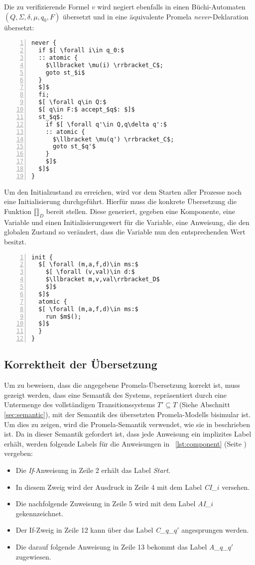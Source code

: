 Die zu verifizierende Formel $v$ wird negiert ebenfalls in einen Büchi-Automaten $(Q,\Sigma,\delta,\mu,q_0,F)$ übersetzt und in eine äquivalente Promela \emph{never}-Deklaration übersetzt:
\begin{lstlisting}[language=Promela,mathescape=true,numbers=left,numberstyle=\small,caption={Verifikationsziel-Übersetzung als \emph{never}-Prozess}]
never {
  if $[ \forall i\in q_0:$
  :: atomic {
    $\llbracket \mu(i) \rrbracket_C$;
    goto st_$i$
  }
  $]$
  fi;
  $[ \forall q\in Q:$
  $[ q\in F:$ accept_$q$: $]$
  st_$q$:
    if $[ \forall q'\in Q,q\delta q':$
    :: atomic {
      $\llbracket \mu(q') \rrbracket_C$;
      goto st_$q'$
    }
    $]$
  $]$
}
\end{lstlisting}

Um den Initialzustand zu erreichen, wird vor dem Starten aller Prozesse noch eine Initialisierung durchgeführt.
Hierfür muss die konkrete Übersetzung die Funktion $\llbracket\rrbracket_D$ bereit stellen.
Diese generiert, gegeben eine Komponente, eine Variable und einen Initialisierungswert für die Variable, eine Anweisung, die den globalen Zustand so verändert, dass die Variable nun den entsprechenden Wert besitzt.
\begin{lstlisting}[language=Promela,mathescape=true,numbers=left,numberstyle=\small,caption={Initialisierungsprozess}]
init {
  $[ \forall (m,a,f,d)\in ms:$
    $[ \forall (v,val)\in d:$
    $\llbracket m,v,val\rrbracket_D$
    $]$
  $]$
  atomic {
  $[ \forall (m,a,f,d)\in ms:$
    run $m$();
  $]$
  }
}
\end{lstlisting}

\subsection{Korrektheit der Übersetzung}
\label{sec:translation-correctness}
Um zu beweisen, dass die angegebene Promela-Übersetzung korrekt ist, muss gezeigt werden, dass eine Semantik des Systems, repräsentiert durch eine Untermenge des vollständigen Transitionssystems $T'\subseteq T$ (Siehe Abschnitt \ref{sec:semantic}), mit der Semantik des übersetzten Promela-Modells bisimular ist.
Um dies zu zeigen, wird die Promela-Semantik verwendet, wie sie in \cite{Gallardo04formalaspects} beschrieben ist.
Da in dieser Semantik gefordert ist, dass jede Anweisung ein implizites Label erhält, werden folgende Labels für die Anweisungen in \lstlistingname~\ref{lst:component} (Seite \pageref{lst:component}) vergeben:
\begin{itemize}
\item Die \emph{If}-Anweisung in Zeile 2 erhält das Label \emph{Start}.
\item In diesem Zweig wird der Ausdruck in Zeile 4 mit dem Label \emph{CI\_$i$} versehen.
\item Die nachfolgende Zuweisung in Zeile 5 wird mit dem Label \emph{AI\_$i$} gekennzeichnet.
\item Der If-Zweig in Zeile 12 kann über das Label \emph{C\_$q$\_$q'$} angesprungen werden.
\item Die darauf folgende Anweisung in Zeile 13 bekommt das Label \emph{A\_$q$\_$q'$} zugewiesen.
\end{itemize}

